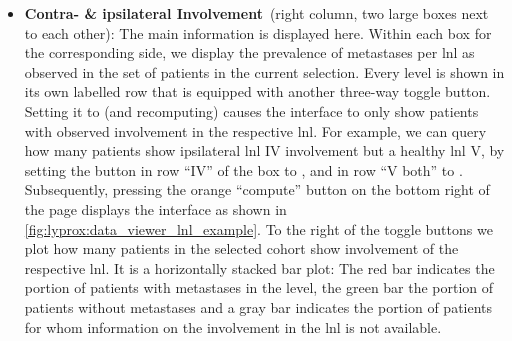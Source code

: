 \documentclass[\relativeRoot/main.tex]{subfiles}
\begin{document}
\begin{itemize}
    \item \textbf{Contra- \& ipsilateral Involvement}~(right column, two large boxes next to each other): The main information is displayed here. Within each box for the corresponding side, we display the prevalence of metastases per \gls{lnl} as observed in the set of patients in the current selection. Every level is shown in its own labelled row that is equipped with another three-way toggle button. Setting it to  (and recomputing) causes the interface to only show patients with observed involvement in the respective \gls{lnl}. For example, we can query how many patients show ipsilateral \gls{lnl} IV involvement but a healthy \gls{lnl} V, by setting the button in row ``IV'' of the box to , and in row ``V both'' to . Subsequently, pressing the orange ``compute'' button on the bottom right of the page displays the interface as shown in \cref{fig:lyprox:data_viewer_lnl_example}. To the right of the toggle buttons we plot how many patients in the selected cohort show involvement of the respective \gls{lnl}. It is a horizontally stacked bar plot: The red bar indicates the portion of patients with metastases in the level, the green bar the portion of patients without metastases and a gray bar indicates the portion of patients for whom information on the involvement in the \gls{lnl} is not available.\\
    [3mm]
\end{itemize}
\end{document}
